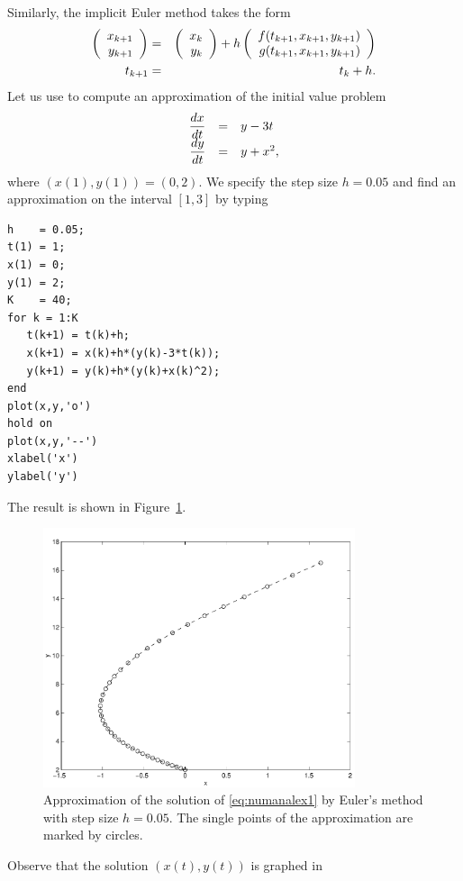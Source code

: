 \documentclass{ximera}
\begin{document}
Similarly, the implicit Euler 
method 
takes the form
\begin{eqnarray*}
\left(\begin{array}{r} x_{k+1} \\ y_{k+1}\end{array}\right) & = &  \left(\begin{array}{r} x_k \\ y_k\end{array}\right) + 
h \left(\begin{array}{r} f(t_{k+1},x_{k+1},y_{k+1}) \\ g(t_{k+1},x_{k+1},y_{k+1})\end{array}\right)\\
t_{k+1} &=& t_k + h.
\end{eqnarray*}
Let us use \Matlab to compute an approximation of the initial
value problem
\arraystart
\begin{equation}
\label{eq:numanalex1}
\begin{array}{rcl}
\displaystyle \frac{dx}{dt} & = & y-3t\\
\displaystyle \frac{dy}{dt} & = & y+x^2,
\end{array}
\end{equation}
\arrayfinish
where $(x(1),y(1))= (0,2)$.  We specify the 
step size $h=0.05$ and find an approximation on the interval 
$[1,3]$ by typing
\begin{verbatim}
h    = 0.05;
t(1) = 1;
x(1) = 0;
y(1) = 2;
K    = 40;
for k = 1:K
   t(k+1) = t(k)+h;
   x(k+1) = x(k)+h*(y(k)-3*t(k));
   y(k+1) = y(k)+h*(y(k)+x(k)^2);
end
plot(x,y,'o')
hold on
plot(x,y,'--')
xlabel('x')
ylabel('y')
\end{verbatim}
The result is shown in Figure~\ref{fig:sysEul1}.
\begin{figure}[htb]
   \centerline{%
   \includegraphics[width=3.6in]{../figures/eulsys1.pdf}}
   \caption{Approximation of the solution of
   \protect\eqref{eq:numanalex1} by Euler's method
   with step size $h=0.05$.  The single points of
   the approximation are marked by circles.}
   \label{fig:sysEul1}
\end{figure}
Observe that the solution $(x(t),y(t))$ is graphed in
\end{document}
